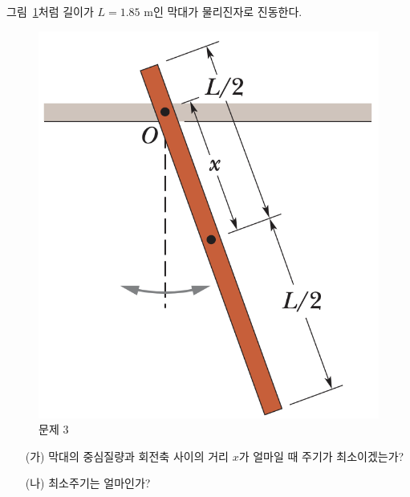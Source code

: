 \documentclass[floatfix,nofootinbib,superscriptaddress,fleqn]{revtex4-2}
\begin{document}
\vspace{1.cm}
 
그림~\ref{fig:2}처럼 길이가 $L=1.85$ m인 막대가 물리진자로 진동한다.
\begin{figure}[ht]
  \centering
\includegraphics[scale=0.45]{Qfig18-2-20220511.png}
  \caption{문제 3}
  \label{fig:2}
\end{figure}
\begin{itemize}
\item[(가)] 막대의 중심질량과 회전축 사이의 거리 $x$가 얼마일 때
  주기가 최소이겠는가?
\item[(나)] 최소주기는 얼마인가?  
\end{itemize}
 
\end{document}
